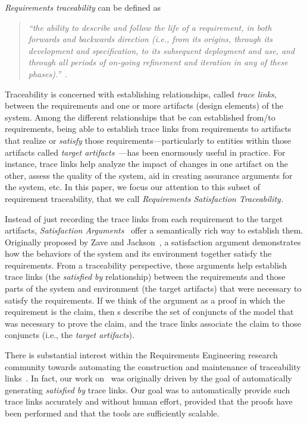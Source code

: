 \emph{Requirements traceability} can be defined as \\
\begin{quotation}
\textit{``the ability to describe and follow the life of a requirement, in both forwards and backwards direction (i.e., from its origins, through its development and specification, to its subsequent deployment and use, and through all periods of on-going refinement and iteration in any of these phases).''}~\cite{gotel}. \\
\end{quotation}


Traceability is concerned with establishing relationships, called \emph{trace links}, between the requirements and one or more artifacts (design elements) of the system.
Among the different relationships that be can established from/to requirements, being able to establish trace links from requirements to artifacts that realize or \emph{satisfy} those requirements---particularly to entities within those artifacts called \emph{target artifacts}~\cite{gotel2012traceability}---has been enormously useful in practice.
For instance, trace links help analyze the impact of changes in one artifact on the other, assess the quality of the system, aid in creating assurance arguments for the system, etc.
In this paper, we focus our attention to this subset of requirement traceability, that we call \emph{Requirements Satisfaction Traceability.}

Instead of just recording the trace links from each requirement to the target artifacts, \emph{Satisfaction Arguments}~\cite{zave1997four} offer a semantically rich way to establish them. Originally proposed by Zave and Jackson~\cite{zave1997four}, a satisfaction argument demonstrates how the behaviors of the system and its environment together satisfy the requirements. From a traceability perspective, these arguments help establish trace links (the \emph{satisfied by} relationship) between the requirements and those parts of the system and environment (the target artifacts) that were necessary to satisfy the requirements.  If we think of the argument as a proof in which the requirement is the claim, then \mivc s describe the set of conjuncts of the model that was necessary to prove the claim, and the trace links associate the claim to those conjuncts (i.e., the {\em target artifacts}).

There is substantial interest within the Requirements Engineering research community towards automating the construction and maintenance of traceability links~\cite{hayes2003improving, egyed2002automating,cleland2007best}.  In fact, our work on \mivcs\ was originally driven by the goal of automatically generating {\em satisfied by} trace links.  Our goal was to automatically provide such trace links accurately and without human effort, provided that the proofs have been performed and that the tools are sufficiently scalable.

